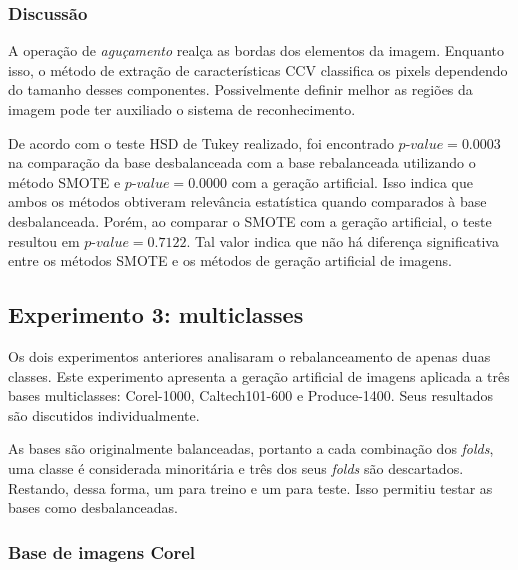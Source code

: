 \subsubsection*{Discussão}

A operação de \emph{aguçamento} realça as bordas dos elementos da imagem. Enquanto isso, o método de extração de características CCV classifica os pixels dependendo do tamanho desses componentes. Possivelmente definir melhor as regiões da imagem pode ter auxiliado o sistema de reconhecimento.

De acordo com o teste HSD de Tukey realizado, foi encontrado $\textit{p-value} = 0.0003$ na comparação da base desbalanceada com a base rebalanceada utilizando o método SMOTE e $\textit{p-value} = 0.0000$ com a geração artificial. Isso indica que ambos os métodos obtiveram relevância estatística quando comparados à base desbalanceada. Porém, ao comparar o SMOTE com a geração artificial, o teste resultou em $\textit{p-value} = 0.7122$. Tal valor indica que não há diferença significativa entre os métodos SMOTE e os métodos de geração artificial de imagens.

\subsection{Experimento 3: multiclasses}

Os dois experimentos anteriores analisaram o rebalanceamento de apenas duas classes. Este experimento apresenta a geração artificial de imagens aplicada a três bases multiclasses: Corel-1000, Caltech101-600 e Produce-1400. Seus resultados são discutidos individualmente.

As bases são originalmente balanceadas, portanto a cada combinação dos \textit{folds}, uma classe é considerada minoritária e três dos seus \textit{folds} são descartados. Restando, dessa forma, um para treino e um para teste. Isso permitiu testar as bases como desbalanceadas.

\subsubsection{Base de imagens Corel}
\label{subsec:corel}


